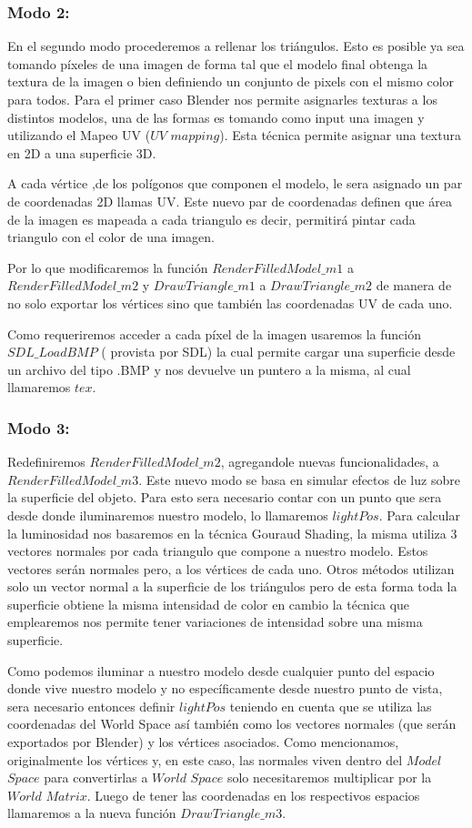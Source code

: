 \documentclass[a4paper]{article}
\newcounter{col}
\begin{document}
\subsubsection{Modo 2:}  
En el segundo modo procederemos a rellenar los triángulos. Esto es posible ya sea tomando píxeles de una imagen de forma tal que el modelo final obtenga la textura de la imagen o bien definiendo un conjunto de pixels con el mismo color para todos. Para el primer caso Blender nos permite asignarles texturas a los distintos modelos, una de las formas es tomando como input una imagen y utilizando el Mapeo UV ($UV$ $mapping$). Esta técnica permite asignar una textura en 2D a una superficie 3D. 
\par A cada vértice ,de los polígonos que componen el modelo, le sera asignado un par de coordenadas 2D llamas UV. Este nuevo par de coordenadas definen que área de la imagen es mapeada a cada triangulo es decir, permitirá pintar cada triangulo con el color de una imagen. 
\par Por lo que modificaremos la función $RenderFilledModel\_m1$ a $RenderFilledModel\_m2$ y $DrawTriangle\_m1$ a $DrawTriangle\_m2$ de manera de no solo exportar los vértices sino que también las coordenadas UV de cada uno.
\par Como requeriremos acceder a cada píxel de la imagen usaremos la función $SDL\_LoadBMP$ ( provista por SDL) la cual permite cargar una superficie desde un archivo del tipo .BMP y nos devuelve un puntero a la misma, al cual llamaremos $tex$.


\subsubsection{Modo 3:}  

Redefiniremos $RenderFilledModel\_m2$, agregandole nuevas funcionalidades, a $RenderFilledModel\_m3$. Este nuevo modo se basa en simular efectos de luz sobre la superficie del objeto. Para esto sera necesario contar con un punto que sera desde donde iluminaremos nuestro modelo, lo llamaremos $lightPos$. Para calcular la luminosidad nos basaremos en la técnica Gouraud Shading, la misma utiliza 3 vectores normales por cada triangulo que compone a nuestro modelo. Estos vectores serán normales pero, a los vértices de cada uno. Otros métodos utilizan solo un vector normal a la superficie de los triángulos pero de esta forma toda la superficie obtiene la misma intensidad de color en cambio la técnica que emplearemos nos permite tener variaciones de intensidad sobre una misma superficie. 
\par Como podemos iluminar a nuestro modelo desde cualquier punto del espacio donde vive nuestro modelo y no específicamente desde nuestro punto de vista, sera necesario entonces definir $lightPos$ teniendo en cuenta que se utiliza las coordenadas del World Space así también como los vectores normales (que serán exportados por Blender) y los vértices asociados. Como mencionamos, originalmente los vértices y, en este caso, las normales viven dentro del $Model$ $Space$ para convertirlas a $World$ $Space$ solo necesitaremos multiplicar por la $World$ $Matrix$.  Luego de tener las coordenadas en los respectivos espacios llamaremos a la nueva función $DrawTriangle\_m3$.
\end{document}
